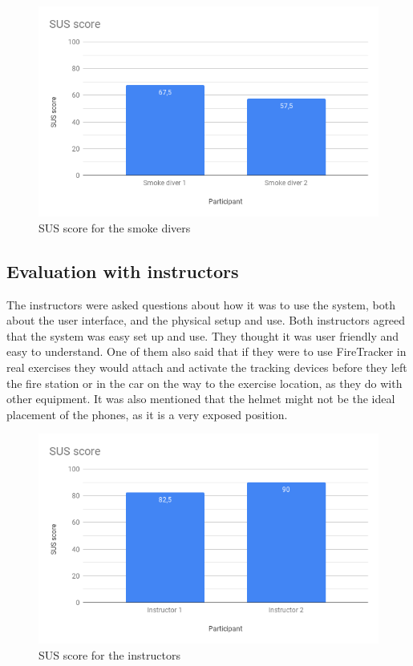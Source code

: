 \documentclass[../Main/thesis.tex]{subfiles}
\begin{document}
\begin{figure}[h]
	\centering
	\includegraphics[width=\textwidth]{../fig/sus-smoke-divers.png}
	\caption{SUS score for the smoke divers}
	\label{fig:sus-smoke-divers}
\end{figure}

\subsection{Evaluation with instructors}
The instructors were asked questions about how it was to use the system, both about the user interface, and the physical setup and use.
Both instructors agreed that the system was easy set up and use.
They thought it was user friendly and easy to understand.
One of them also said that if they were to use FireTracker in real exercises they would attach and activate the tracking devices before they left the fire station or in the car on the way to the exercise location, as they do with other equipment.
It was also mentioned that the helmet might not be the ideal placement of the phones, as it is a very exposed position.

\begin{figure}[h]
	\centering
	\includegraphics[width=\textwidth]{../fig/sus-instructors.png}
	\caption{SUS score for the instructors}
	\label{fig:sus-instructors}
\end{figure}
\end{document}
